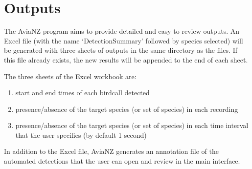\documentclass{article}
\begin{document}
\section{Outputs}
\label{sec:outputs}
The AviaNZ program aims to provide detailed and easy-to-review outputs. An Excel file (with the name `DetectionSummary' followed by species selected) will be generated with three sheets of outputs in the same directory as the files. If this file already exists, the new results will be appended to the end of each sheet. 

The three sheets of the Excel workbook are:

\begin{enumerate}
\item start and end times of each birdcall detected
\item presence/absence of the target species (or set of species) in each recording
\item  presence/absence of the target species (or set of species) in each time interval that the user specifies (by default 1 second)
\end{enumerate}

In addition to the Excel file, AviaNZ generates an annotation file of the automated detections that  the user can open and review in the main interface.
\end{document}
